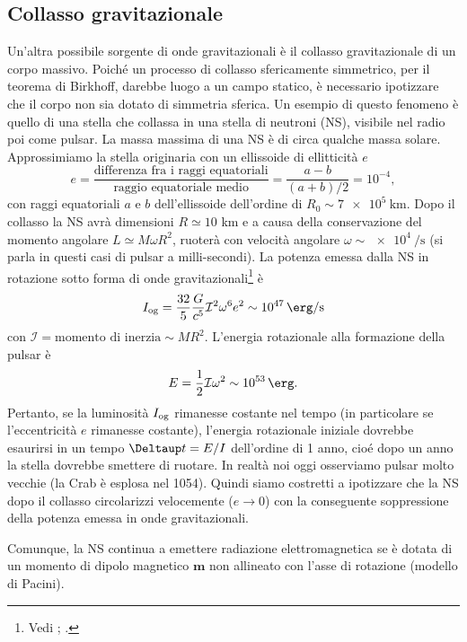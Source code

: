 \subsection{Collasso gravitazionale}
\label{sec:collasso-grav}

Un'altra possibile sorgente di onde gravitazionali è il collasso gravitazionale
di un corpo massivo.  Poiché un processo di collasso sfericamente simmetrico,
per il teorema di Birkhoff, darebbe luogo a un campo statico, è necessario
ipotizzare che il corpo non sia dotato di simmetria sferica.  Un esempio di
questo fenomeno è quello di una stella che collassa in una stella di neutroni
(NS), visibile nel radio poi come pulsar.  La massa massima di una NS è di circa
qualche massa solare.  Approssimiamo la stella originaria con un ellissoide di
ellitticità $e$
\begin{equation}
  e = \frac{\text{differenza fra i raggi equatoriali}}{\text{raggio equatoriale
      medio}}  = \frac{a-b}{(a+b)/2} = 10^{-4},
\end{equation}
con raggi equatoriali $a$ e $b$ dell'ellissoide dell'ordine di $R_{0} \sim
\SI{7e5}{\kilo\metre}$.  Dopo il collasso la NS avrà dimensioni $R \simeq 10$ km
e a causa della conservazione del momento angolare $L \simeq M \omega R^2$,
ruoterà con velocità angolare $\omega \sim
\SI[per-mode=reciprocal]{e4}{\per\second}$ (si parla in questi casi di pulsar a
milli-secondi).  La potenza emessa dalla NS in rotazione sotto forma di onde
gravitazionali\footnote{Vedi \textcite[488]{shapiro:black-holes};
  \textcite[272]{weinberg:gravitation}.} è
\begin{equation}
  I_{\textup{og}} = \frac{32}{5} \frac{G}{c^{5}} \mathcal{I}^{2} \omega^{6}
  e^{2} \sim \SI{e47}{\erg\per\second}
\end{equation}
con $\mathcal{I} = \text{momento di inerzia} \sim MR^{2}$.  L'energia
rotazionale alla formazione della pulsar è
\begin{equation}
  E = \frac{1}{2} \mathcal{I} \omega^{2} \sim \SI{e53}{\erg}.
\end{equation}
Pertanto, se la luminosità $I_{\textup{og}}$ rimanesse costante nel tempo (in
particolare se l'eccentricità $e$ rimanesse costante), l'energia rotazionale
iniziale dovrebbe esaurirsi in un tempo $\var t = E/I$ dell'ordine di 1 anno,
cio\'e dopo un anno la stella dovrebbe smettere di ruotare.  In realtà noi oggi
osserviamo pulsar molto vecchie (la Crab è esplosa nel 1054).  Quindi siamo
costretti a ipotizzare che la NS dopo il collasso circolarizzi velocemente ($e
\to 0$) con la conseguente soppressione della potenza emessa in onde
gravitazionali.

Comunque, la NS continua a emettere radiazione elettromagnetica se è dotata di
un momento di dipolo magnetico $\bm{m}$ non allineato con l'asse di rotazione
(modello di Pacini).

